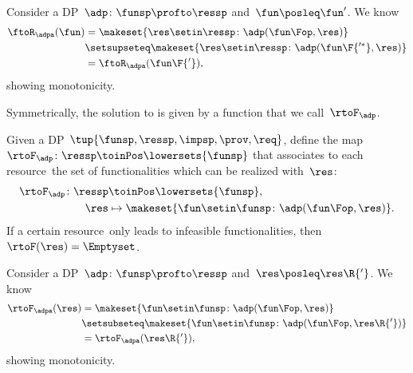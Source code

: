 \begin{remark}[Monotonicity]
    Consider a DP~$\adp\colon\funsp\profto\ressp$ and~$\fun\posleq \fun'$.
    We know
    \begin{equation*}
        \begin{aligned}
            \ftoR_\adpa(\fun) & =\makeset{ \res \setin \ressp \colon \adp(\fun\Fop, \res)} \\
                              & \setsupseteq \makeset{ \res \setin \ressp \colon \adp(\fun\F{'^*}, \res)} \\
                              & =\ftoR_\adpa(\fun\F{'}),
        \end{aligned}
    \end{equation*}
    showing monotonicity.
\end{remark}

Symmetrically, the solution to \FixResMaxFun is given by a function that we call~$\rtoF_\adp$.

\begin{definition}
    \label{def:rtoF-dp}
    Given a DP~$\tup{ \funsp,\ressp,\impsp,\prov,\req}$, define the map~$\rtoF_{\adp}\colon \ressp\toinPos  \lowersets{\funsp}$ that associates to each resource~\res the set of functionalities which can be realized with~$\res$:
    \begin{equation*}
        \begin{aligned}
            \rtoF_{\adp}\colon \ressp & \toinPos \lowersets{\funsp}, \\
            \res                      & \mapsto \makeset{ \fun \setin \funsp \colon \adp(\fun\Fop, \res)}.
        \end{aligned}
    \end{equation*}
    If a certain resource~\res only leads to infeasible functionalities, then~$\rtoF(\res)=\Emptyset$.
\end{definition}

\begin{remark}[Monotonicity]
    Consider a DP~$\adp\colon\funsp\profto\ressp$ and~$\res\posleq \res\R{'}$.
    We know
    \begin{equation*}
        \begin{aligned}
            \rtoF_\adpa(\res) & =\makeset{ \fun \setin \funsp \colon \adp(\fun\Fop, \res)} \\
                              & \setsubseteq \makeset{ \fun \setin \funsp \colon \adp(\fun\Fop, \res\R{'})} \\
                              & =\rtoF_\adpa(\res\R{'}),
        \end{aligned}
    \end{equation*}
    showing monotonicity.
\end{remark}

